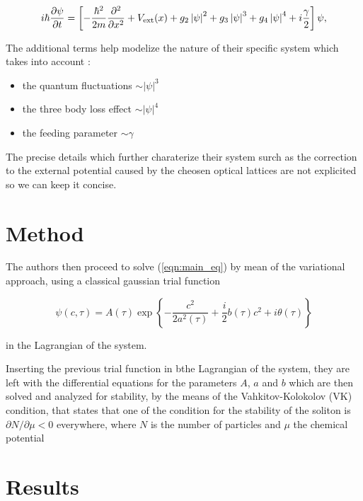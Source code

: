 \documentclass[a4paper]{article}
\begin{document}
\begin{equation}
i\hbar\frac{\partial \psi}{\partial t}
  = \left[ -\frac{\hbar^2}{2m}\frac{\partial^2}{\partial x^2} + V_{\rm ext}(x) 
+ g_2\left|\psi \right|^2
+ g_3\left|\psi \right|^3
+ g_4\left|\psi \right|^4
 + i\frac{\gamma}{2}
\right]\psi, \label{eqn:main_eq}
\end{equation}

The additional terms help modelize the nature of their specific system
which takes into account :

\begin{itemize}
\item the quantum fluctuations $\sim\left| \psi\right|^3$
\item the three body loss effect $\sim\left| \psi\right|^4$
\item the feeding parameter $\sim\gamma$
\end{itemize}

The precise details which further charaterize their system 
surch as the correction to the external potential caused by the cheosen 
optical lattices are not explicited 
so we can keep it concise.

\section{Method}

The authors then proceed to solve (\ref{eqn:main_eq}) by mean of 
the variational approach, using a classical gaussian trial function

\begin{equation}
\psi(c,\tau) = A(\tau)
\exp\left\lbrace -\frac{c^2}{2a^2(\tau)}
 + \frac{i}{2}b(\tau)c^2  + i\theta(\tau)\right\rbrace
\end{equation}

in the Lagrangian of the system.

Inserting the previous trial function in bthe Lagrangian of the system, 
they are left with the
differential equations for the parameters $A$, $a$ and $b$
which are then solved and analyzed for stability, by the means of 
the Vahkitov-Kolokolov (VK) condition, that states that one of the condition 
for the stability of the soliton is $\partial N/\partial \mu < 0$ everywhere,
where $N$ is the number of particles and $\mu$ the chemical potential

\section{Results}
\end{document}
